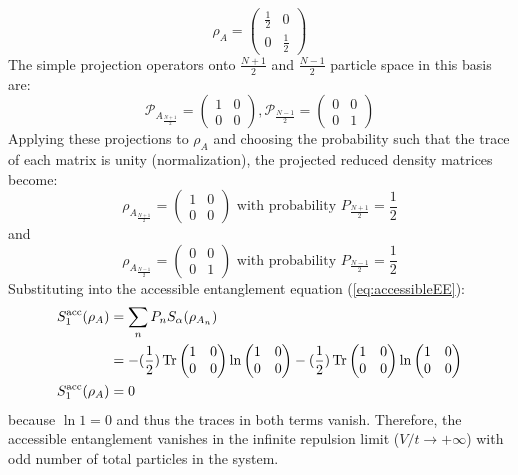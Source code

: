 %
\begin{equation}
\rho_{A} = 
\begin{pmatrix}
\frac{1}{2} & 0 \\
0 & \frac{1}{2}
\end{pmatrix}
\end{equation}
%
The simple projection operators onto $\frac{N+1}{2}$ and $\frac{N-1}{2}$ particle space in this basis are:
%
\begin{equation}
\mathcal{P}_{A_{\frac{N+1}{2}}} = \begin{pmatrix} 1 & 0 \\ 0 & 0 \end{pmatrix} , 
\mathcal{P}_{\frac{N-1}{2}} = \begin{pmatrix} 0 & 0 \\ 0 & 1 \end{pmatrix} 
\end{equation}
%
Applying these projections to $\rho_{A}$ and choosing the probability such that the trace of each matrix is unity (normalization), the projected reduced density matrices become:
%
\begin{equation}
\rho_{A_{\frac{N+1}{2}}} = \begin{pmatrix} 1 & 0 \\ 0 & 0 \end{pmatrix}  \text{ with probability } P_{\frac{N+1}{2}} = \frac{1}{2}
\end{equation}
%
and 
%
\begin{equation}
\rho_{A_{\frac{N-1}{2}}} = \begin{pmatrix} 0 & 0 \\ 0 & 1 \end{pmatrix}  \text{ with probability } P_{\frac{N-1}{2}} = \frac{1}{2}
\end{equation}
%
Substituting into the accessible entanglement equation (\ref{eq:accessibleEE}):
%
\begin {align} 
S_{1}^{\rm acc}(\rho_A) &= \sum_{n} P_n S_{\alpha}(\rho_{A_n}) \nonumber \\
&= -(\frac{1}{2})\operatorname{Tr}{\begin{pmatrix}  1 & 0 \\ 0 & 0   \end{pmatrix}\ln{\begin{pmatrix} 1 & 0 \\ 0 & 0   \end{pmatrix}}} -(\frac{1}{2})\operatorname{Tr}{\begin{pmatrix}  1 & 0 \\ 0 & 0   \end{pmatrix}\ln{\begin{pmatrix} 1 & 0 \\ 0 & 0   \end{pmatrix}}}  \nonumber \\
S_{1}^{\rm acc}(\rho_A) &= 0
\end {align}
%
because $\ln{1}=0$ and thus the traces in both terms vanish. Therefore, the accessible entanglement vanishes in the infinite repulsion limit ($V/t \to + \infty$) with odd number of total particles in the system.

